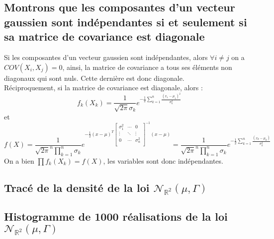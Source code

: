 \documentclass{report}
\begin{document}
		\subsection{Montrons que les composantes d'un vecteur gaussien sont indépendantes si et seulement si sa matrice de covariance est diagonale}
			Si les composantes d'un vecteur gaussien sont indépendantes, alors $\forall i \neq j$ on a $COV(X_i, X_j) = 0$, ainsi, la matrice de covariance a tous ses éléments non diagonaux qui sont nuls. Cette dernière est donc diagonale.\\
			Réciproquement, si la matrice de covariance est diagonale, alors :
			\[ f_k(X_k) = \frac{1}{\sqrt{2\pi}\sigma_k}e^{-\frac{1}{2}\sum\limits_{k=1}^{n}\frac{(x_1 - \mu_1)^2}{\sigma_k^2}} \]
			et
			\[f(X) = \frac{1}{\sqrt{2\pi}^n\prod\limits_{k=1}^{n}\sigma_k}e^{-\frac{1}{2}(x-\mu)^T\left[ 
				\begin{array}{ccc} 
					\sigma_1^2 & \cdots & 0 \\
					\vdots & \ddots & \vdots \\
					0 & \cdots & \sigma_n^2 \\
				\end{array} 
			\right]^{-1}(x-\mu)} = \frac{1}{\sqrt{2\pi}^n\prod\limits_{k=1}^{n}\sigma_k}e^{-\frac{1}{2}\sum\limits_{k=1}^{n}\frac{(x_k - \mu_k)}{\sigma_k^2}} \]
			On a bien $\prod\limits f_k(X_k) = f(X)$, les variables sont donc indépendantes.

		\subsection{Tracé de la densité de la loi $\mathcal{N}_{\mathbb{R}^2}(\mu, \Gamma)$}
		\subsection{Histogramme de 1000 réalisations de la loi $\mathcal{N}_{\mathbb{R}^2}(\mu, \Gamma)$}
		
\end{document}
